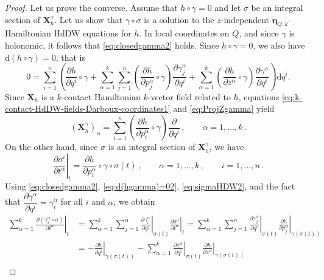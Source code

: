 \documentclass[11pt,twoside]{article}
\theoremstyle{plain}
\theoremstyle{definition}
\theoremstyle{remark}
\newcommand{\dd}{\mathrm{d}}
\newcommand\restr[2]{\left.#1\right|_{#2}} \newcommand{\bfX}{\mathbf{X}} \newcommand{\bfY}{\mathbf{Y}} \newcommand{\bfZ}{\mathbf{Z}} \newcommand{\qeddiamond}{\hfill $\diamond$} \newcommand{\parder}[2]{\frac{\partial #1}{\partial #2}} \newcommand{\dparder}[2]{\dfrac{\partial #1}{\partial #2}} \newcommand{\tparder}[2]{\partial #1/\partial #2} \newcommand{\parderr}[3]{\frac{\partial^2 #1}{\partial #2\partial #3}} \newcommand{\dparderr}[3]{\dfrac{\partial^2 #1}{\partial #2\partial #3}} \newcommand{\tparderr}[3]{\partial^2 #1/\partial #2\partial #3}
\begin{document}
\begin{proof}
Let us prove the converse. Assume that \(h\circ \gamma =0\) and let \(\sigma\) be an integral section of \(\mathbf{X}_h^\gamma\). Let us show that \(\gamma \circ \sigma\) is a solution to the $z$-independent $\bm\eta_{Q,k}$-Hamiltonian HdDW equations for \(h\). In local coordinates on \(Q\), and since \(\gamma\) is holonomic, it follows that \eqref{eq:closedgamma2} holds. Since \(h\circ \gamma=0\), we also have \(\dd(h\circ \gamma)=0\), that is
\begin{equation}
\label{eq:d(hgamma)=02}
0 = \sum_{i=1}^n\left(\frac{\partial h}{\partial q^i}\circ \gamma + \sum_{\alpha=1}^k\sum_{j=1}^n\left(\frac{\partial h}{\partial p^\alpha_j}\circ \gamma\right)\frac{\partial \gamma^\alpha_j}{\partial q^i} + \sum_{\alpha=1}^k\left(\frac{\partial h}{\partial z^\alpha}\circ \gamma\right)\frac{\partial \gamma^\alpha}{\partial q^i}\right)\dd q^i.
\end{equation}
Since \(\mathbf{X}_h\) is a $k$-contact Hamiltonian $k$-vector field related to \(h\), equations \eqref{eq:k-contact-HdDW-fields-Darboux-coordinates1} and \eqref{eq:ProjZgamma} yield
\[
(\mathbf X_h^\gamma)_\alpha = \sum_{i=1}^n\left(\frac{\partial h}{\partial p_i^\alpha}\circ \gamma\right)\frac{\partial}{\partial q^i}\,,\qquad \alpha=1,\dotsc,k\,.
\]
On the other hand, since \(\sigma\) is an integral section of \(\mathbf X_h^\gamma\), we have
\begin{equation}
\label{eq:sigmaHDW2}
\restr{\frac{\partial \sigma^i}{\partial t^\alpha}}{t} = \frac{\partial h}{\partial p_i^\alpha}\circ \gamma \circ \sigma(t)\,,\qquad \alpha=1,\dotsc,k\,,\qquad i=1,\dotsc,n\,.
\end{equation}
Using \eqref{eq:closedgamma2}, \eqref{eq:d(hgamma)=02}, \eqref{eq:sigmaHDW2}, and the fact that \(\dfrac{\partial \gamma^\alpha}{\partial q^i}= \gamma_i^\alpha\) for all \(i\) and \(\alpha\), we obtain
\begin{align}
\sum_{\alpha=1}^k \restr{\frac{\partial(\gamma_i^\alpha \circ \sigma)}{\partial t^\alpha}}{t}
& =
\sum_{\alpha=1}^k\sum_{j=1}^n \restr{\frac{\partial \gamma_i^\alpha}{\partial q^j}}{\sigma(t)} \restr{\frac{\partial \sigma^j}{\partial t^\alpha}}{t}
=
\sum_{\alpha=1}^k\sum_{j=1}^n \restr{\frac{\partial \gamma_j^\alpha}{\partial q^i}}{\sigma(t)} \restr{\frac{\partial h}{\partial p_j^\alpha}}{\gamma(\sigma(t))} \\
&=
- \restr{\frac{\partial h}{\partial q^i}}{\gamma(\sigma(t))}
- \sum_{\alpha=1}^k \restr{\frac{\partial \gamma^\alpha}{\partial q^i}}{\sigma(t)} \restr{\frac{\partial h}{\partial z^\alpha}}{\gamma(\sigma(t))} \\

\end{align}
\end{proof}
\end{document}

